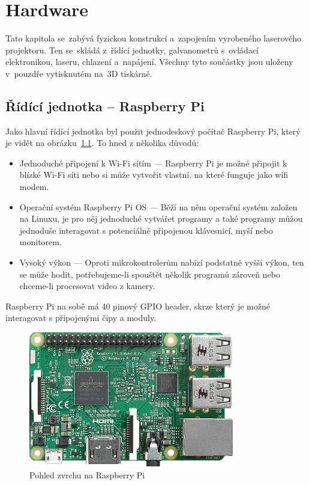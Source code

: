 \chapter{Hardware}
Tato kapitola se~zabývá fyzickou konstrukcí a~zapojením vyrobeného laserového projektoru. Ten se~skládá z~řídící jednotky, galvanometrů s~ovládací elektronikou, laseru, chlazení a~napájení. Všechny tyto součástky jsou uloženy v~pouzdře vytisknutém na~3D tiskárně.

\section{Řídící jednotka -- Raspberry Pi}
Jako hlavní řídící jednotka byl použit jednodeskový počítač Raspberry Pi, který je vidět na obrázku~\ref{fig:RPi}. To hned z několika důvodů:
\begin{itemize}
  \item Jednoduché připojení k Wi-Fi sítím --- Raspberry Pi je možné připojit k blízké Wi-Fi síti nebo si může vytvořit vlastní, na které funguje jako wifi modem.
  \item Operační systém Raspberry Pi OS --- Běží na něm operační systém založen na Linuxu, je pro něj jednoduché vytvářet programy a také programy můžou jednoduše interagovat s potenciálně připojenou klávesnicí, myší nebo monitorem.
  \item Vysoký výkon --- Oproti mikrokontrolerům nabízí podstatně vyšší výkon, ten se může hodit, potřebujeme-li spouštět několik programů zároveň nebo chceme-li procesovat video z kamery.
\end{itemize}
Raspberry Pi na sobě má 40 pinový GPIO header, skrze který je možné interagovat s připojenými čipy a moduly.

\begin{figure}[htb]
    \centering
  \includegraphics[width=0.8\textwidth]{img/RPi.png}
  \caption{\label{fig:RPi} Pohled zvrchu na Raspberry Pi~\cite{rpi-image}}
\end{figure}












